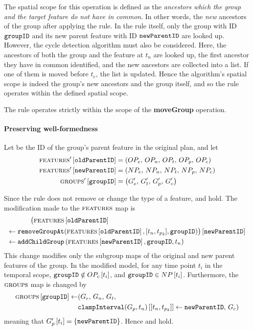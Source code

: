    The spatial scope for this operation is defined as the \emph{ancestors which the group and the target feature do not have in common}. In other words, the \emph{new} ancestors of the group after applying the rule. In the rule itself, only the group with ID $\texttt{groupID}$ and its new parent feature with ID $\texttt{newParentID}$ are looked up. However, the cycle detection algorithm must also be considered. Here, the ancestors of both the group and the feature at $t_n$ are looked up, the first ancestor they have in common identified, and the new ancestors are collected into a list. If one of them is moved before $t_e$, the list is updated. Hence the algorithm's spatial scope is indeed the group's new ancestors and the group itself, and so the rule operates within the defined spatial scope.
\\

\begin{lemma}
   The  rule operates strictly within the scope of the \textbf{moveGroup} operation.
   \label{lemma:move-group-scope}
\end{lemma}

\paragraph{Preserving well-formedness}
Let  be the ID of the group's parent feature in the original plan, and let
\begin{align*}
   \textsc{features}' \left[ \texttt{oldParentID} \right] &= \left(OP_e,\, OP_n,\, OP_t,\, OP_p,\, OP_c\right) \\
   \textsc{features}' \left[ \texttt{newParentID} \right] &= \left(NP_e,\, NP_n,\, NP_t,\, NP_p,\, NP_c\right) \\
   \textsc{groups}{}' \left[ \texttt{groupID} \right] &= \left(G'_e,\, G'_t,\, G'_p,\, G'_c\right)
\end{align*}

Since the  rule does not remove or change the type of a feature,  and  hold. The modification made to the $\textsc{features}{}$ map is 
\begin{align*}
   \lookup{\big(\lookup{\features{}&}{\var{oldParentID}} \\
   \assign  \var{removeGroupAt}& (\lookup{\features{}}{\var{oldParentID}}, \interval{t_n}{t_{p_2}}, \var{groupID})\big)}{\var{newParentID}} \\
   \assign  \var{addChildGroup}& \left(\lookup{\features{}}{\var{newParentID}}, \var{groupID}, t_n\right)
\end{align*}
This change modifies only the subgroup maps of the original and new parent features of the group. In the modified model, for any time point $t_i$ in the temporal scope, $\texttt{groupID} \notin OP_c \left[ t_i \right]$, and $\texttt{groupID} \in NP \left[ t_i \right]$. Furthermore, the $\textsc{groups}{}{}$ map is changed by
\begin{align*}
   \lookup{\groups{}}{\var{groupID}} \assign &(G_e,\, G_n,\, G_t,\, \\
                                             & \lookup{\var{clampInterval}(G_p, t_n)}{\interval{t_n}{t_{p_2}}} \assign \var{newParentID},\, G_c)
\end{align*}
meaning that $G'_p \left[ t_i \right] = \left\{\texttt{newParentID}\right\}$. Hence  and  hold. 

